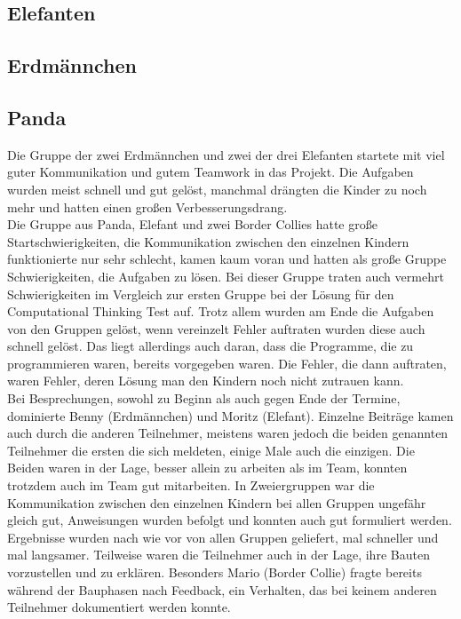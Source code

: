 	\subsection{Elefanten}
	\subsection{Erdmännchen}
	\subsection{Panda}
	
	
	
	
	
	
	Die Gruppe der zwei Erdmännchen und zwei der drei Elefanten startete mit viel guter Kommunikation und gutem Teamwork in das Projekt. Die Aufgaben wurden meist schnell und gut gelöst, manchmal drängten die Kinder zu noch mehr und hatten einen großen Verbesserungsdrang.\\
	Die Gruppe aus Panda, Elefant und zwei Border Collies hatte große Startschwierigkeiten, die Kommunikation zwischen den einzelnen Kindern funktionierte nur sehr schlecht, kamen kaum voran und hatten als große Gruppe Schwierigkeiten, die Aufgaben zu lösen. Bei dieser Gruppe traten auch vermehrt Schwierigkeiten im Vergleich zur ersten Gruppe bei der Lösung für den Computational Thinking Test auf.
	Trotz allem wurden am Ende die Aufgaben von den Gruppen gelöst, wenn vereinzelt Fehler auftraten wurden diese auch schnell gelöst. Das liegt allerdings auch daran, dass die Programme, die zu programmieren waren, bereits vorgegeben waren. Die Fehler, die dann auftraten, waren Fehler, deren Lösung man den Kindern noch nicht zutrauen kann.\\
	Bei Besprechungen, sowohl zu Beginn als auch gegen Ende der Termine, dominierte Benny (Erdmännchen) und Moritz (Elefant). Einzelne Beiträge kamen auch durch die anderen Teilnehmer, meistens waren jedoch die beiden genannten Teilnehmer die ersten die sich meldeten, einige Male auch die einzigen. Die Beiden waren in der Lage, besser allein zu arbeiten als im Team, konnten trotzdem auch im Team gut mitarbeiten.
	In Zweiergruppen war die Kommunikation zwischen den einzelnen Kindern bei allen Gruppen ungefähr gleich gut, Anweisungen wurden befolgt und konnten auch gut formuliert werden. Ergebnisse wurden nach wie vor von allen Gruppen geliefert, mal schneller und mal langsamer. Teilweise waren die Teilnehmer auch in der Lage, ihre Bauten vorzustellen und zu erklären. Besonders Mario (Border Collie) fragte bereits während der Bauphasen nach Feedback, ein Verhalten, das bei keinem anderen Teilnehmer dokumentiert werden konnte.\\ 
